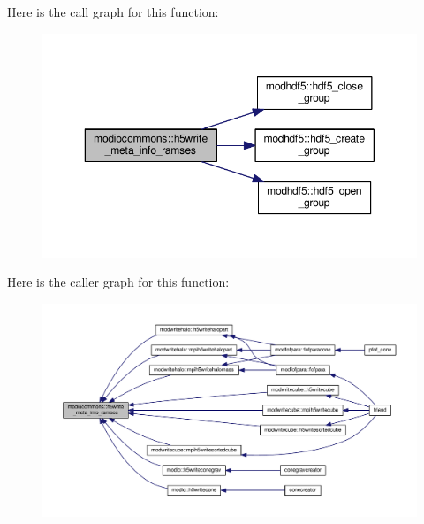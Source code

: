 Here is the call graph for this function\+:\nopagebreak
\begin{figure}[H]
\begin{center}
\leavevmode
\includegraphics[width=350pt]{namespacemodiocommons_aa0393a317c75eb21189d5d381c3cf591_cgraph}
\end{center}
\end{figure}




Here is the caller graph for this function\+:\nopagebreak
\begin{figure}[H]
\begin{center}
\leavevmode
\includegraphics[width=350pt]{namespacemodiocommons_aa0393a317c75eb21189d5d381c3cf591_icgraph}
\end{center}
\end{figure}


